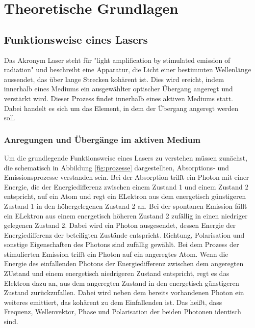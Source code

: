 \section{Theoretische Grundlagen}
    
    \subsection{Funktionsweise eines Lasers}
        Das Akronym Laser steht für "light amplification by stimulated emission of radiation" und beschreibt eine Apparatur, die Licht einer bestimmten Wellenlänge aussendet, das über lange Strecken kohärent 
        ist. Dies wird ereicht, indem innerhalb eines Mediums ein ausgewählter optischer Übergang angeregt und verstärkt wird. Dieser Prozess findet innerhalb eines aktiven Mediums statt. Dabei handelt es 
        sich um das Element, in dem der Übergang angeregt werden soll. 
        
        \subsubsection{Anregungen und Übergänge im aktiven Medium}
            Um die grundlegende Funktionsweise eines Lasers zu verstehen müssen zunächst, die schematisch in Abbildung \ref{fig:prozesse} dargestellten, Absorptions- und Emissionsprozesse verstanden sein. Bei 
            der Absorption trifft ein Photon mit einer Energie, die der Energiedifferenz zwischen einem Zustand 1 und einem Zustand 2 entspricht, auf ein Atom und regt ein ELektron aus dem energetisch
            günstigeren Zustand 1 in den höhergelegenen Zustand 2 an. Bei der spontanen Emission fällt ein ELektron aus einem energetisch höheren Zustand 2 zufällig in einen niedriger gelegenen Zustand 2. Dabei 
            wird ein Photon ausgesendet, dessen Energie der Energiedifferenz der beteiligten Zustände entspricht. Richtung, Polarisation und sonstige Eigenschaften des Photons sind zufällig gewählt. Bei dem 
            Prozess der stimulierten Emission trifft ein Photon auf ein angeregtes Atom. Wenn die Energie des einfallenden Photons der Energiedifferenz zwischen dem angeregten ZUstand und einem energetisch
            niedrigeren Zustand entspricht, regt es das Elektron dazu an, aus dem angeregten Zustand in den energetisch günstigeren Zustand zurückzufallen. Dabei wird neben dem bereits vorhandenen Photon ein
            weiteres emittiert, das kohärent zu dem Einfallenden ist. Das heißt, dass Frequenz, Wellenvektor, Phase und Polarisation der beiden Photonen identisch sind.      


